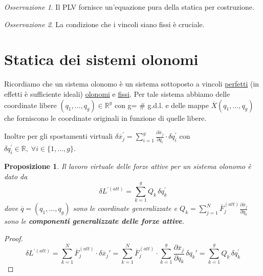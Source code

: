 \documentclass{book}
\theoremstyle{plain}
\theoremstyle{plain}
\theoremstyle{plain}
\theoremstyle{plain}
\theoremstyle{plain}
\newtheorem{prop}{Proposizione}[chapter]
\theoremstyle{definition}
\theoremstyle{remark}
\newtheorem*{oss}{Osservazione}
\theoremstyle{definition}
\begin{document}
\begin{oss}
    Il PLV fornisce un'equazione pura della statica per costruzione.
\end{oss}

\begin{oss}
    La condizione che i vincoli siano fissi è cruciale.
\end{oss}

\section{Statica dei sistemi olonomi}

Ricordiamo che un sistema olonomo è un sistema sottoposto a vincoli \underline{perfetti} (in effetti è sufficiente ideali) \underline{olonomi} e \underline{fissi}.
Per tale sistema abbiamo delle coordinate libere $\left(q_1, \ldots, q_g\right) \in \mathbb{R}^g$ con g= \# g.d.l. e delle mappe $\overline{X}\left(q_1, \ldots, q_g\right)$ che forniscono le coordinate originali in funzione di quelle libere.

\noindent Inoltre per gli spostamenti virtuali $\delta \overline{x}_{j}^{\prime}=\sum_{i=1}^{g} \frac{\partial \overline{x}_{j}}{\partial q_{i}} \cdot \delta q_{i}^{\prime}$ con $\delta q_i^{\prime} \in \mathbb{R}, \; \forall i \in \{1, \ldots, g\}$.


\begin{prop}
\everymath{\displaystyle}
    Il lavoro virtuale delle forze attive per un sistema olonomo è dato da
    \begin{displaymath}
        \delta L^{\prime(att)}=\sum_{k=1}^{g} Q_{k} \, \delta q_{k}^{\prime}
    \end{displaymath}
    dove $\overline{q}= \left(q_1, \ldots, q_g\right)$ sono le coordinate generalizzate e $Q_{k}=\sum_{j=1}^{N} \overline{F}_{j}^{(att)} \frac{\partial \overline{x}_{j}}{\partial q_{k}}$ sono le \textbf{componenti generalizzate delle forze attive}.
\end{prop}

\begin{proof}
    \begin{displaymath}
        \delta L^{\prime(att)}=\sum_{k=1}^{N}\overline{F}_j^{(att)}\cdot\delta\overline{x}_j'=\sum_{k=1}^{N}\overline{F}_j^{(att)}\cdot\sum_{k=1}^{g}\frac{\partial\overline{x}_j}{\partial q_k}\,\delta q_k'=\sum_{k=1}^{g} Q_{k} \, \delta q_{k}^{\prime}
    \end{displaymath}
\end{proof}
\end{document}
